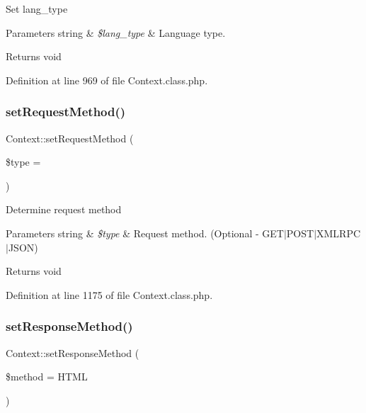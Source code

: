 Set lang\+\_\+type


\begin{DoxyParams}[1]{Parameters}
string & {\em \$lang\+\_\+type} & Language type. \\
\hline
\end{DoxyParams}
\begin{DoxyReturn}{Returns}
void 
\end{DoxyReturn}


Definition at line 969 of file Context.\+class.\+php.

\mbox{\label{classContext_afe9abd67c51e0ecc07cf29bf23102926}} 
\subsubsection{\texorpdfstring{set\+Request\+Method()}{setRequestMethod()}}
{\footnotesize\ttfamily Context\+::set\+Request\+Method (\begin{DoxyParamCaption}\item[{}]{\$type = {\ttfamily \textquotesingle{}\textquotesingle{}} }\end{DoxyParamCaption})}

Determine request method


\begin{DoxyParams}[1]{Parameters}
string & {\em \$type} & Request method. (Optional -\/ G\+E\+T$\vert$\+P\+O\+S\+T$\vert$\+X\+M\+L\+R\+P\+C$\vert$\+J\+S\+ON) \\
\hline
\end{DoxyParams}
\begin{DoxyReturn}{Returns}
void 
\end{DoxyReturn}


Definition at line 1175 of file Context.\+class.\+php.

\mbox{\label{classContext_acedc76f48ba8b7342b1bca29fcb8f202}} 
\subsubsection{\texorpdfstring{set\+Response\+Method()}{setResponseMethod()}}
{\footnotesize\ttfamily Context\+::set\+Response\+Method (\begin{DoxyParamCaption}\item[{}]{\$method = {\ttfamily \textquotesingle{}HTML\textquotesingle{}} }\end{DoxyParamCaption})}

